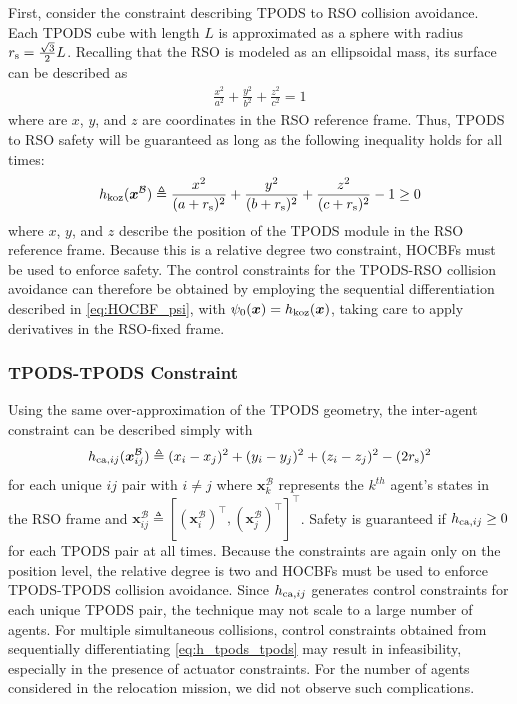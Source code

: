 First, consider the constraint describing TPODS to RSO collision avoidance. Each TPODS cube with length $L$ is approximated as a sphere with radius $r_{\rm s}=\frac{\sqrt{3}}{2}L$. Recalling that the RSO is modeled as an ellipsoidal mass, its surface can be described as
\begin{align}
    \frac{x^2}{a^2} + \frac{y^2}{b^2} + \frac{z^2}{c^2} = 1
\end{align}
where are $x$, $y$, and $z$ are coordinates in the RSO reference frame. Thus, TPODS to RSO safety will be guaranteed as long as the following inequality holds for all times:
\begin{align} \label{eq:koz}
    h_{\rm koz}(\boldsymbol{x}^{\mathcal{B}}) \triangleq \frac{x^2}{(a+r_{\rm s})^2} + \frac{y^2}{(b+r_{\rm s})^2} + \frac{z^2}{(c+r_{\rm s})^2} - 1 \geq 0
\end{align}
where $x$, $y$, and $z$ describe the position of the TPODS module in the RSO reference frame. Because this is a relative degree two constraint, HOCBFs must be used to enforce safety. The control constraints for the TPODS-RSO collision avoidance can therefore be obtained by employing the sequential differentiation described in \eqref{eq:HOCBF_psi}, with $\psi_0(\boldsymbol{x}) = h_{\rm koz}(\boldsymbol{x})$, taking care to apply derivatives in the RSO-fixed frame.

\subsubsection{TPODS-TPODS Constraint}

Using the same over-approximation of the TPODS geometry, the inter-agent constraint can be described simply with 
\begin{align} \label{eq:h_tpods_tpods}
    h_{{\rm ca},ij}(\boldsymbol{x}_{ij}^{\mathcal{B}}) \triangleq (x_i - x_j)^2 + (y_i - y_j)^2 + (z_i - z_j)^2 - (2r_{\rm s})^2
\end{align}
for each unique $ij$ pair with $i \neq j$ where $\boldsymbol{x}_{k}^{\mathcal{B}}$ represents the $k^{th}$ agent's states in the RSO frame and $\boldsymbol{x}_{ij}^{\mathcal{B}} \triangleq [(\boldsymbol{x}_{i}^{\mathcal{B}})^{\top}, (\boldsymbol{x}_{j}^{\mathcal{B}})^{\top}]^{\top}$. Safety is guaranteed if $h_{{\rm ca},ij} \geq 0$ for each TPODS pair at all times. Because the constraints are again only on the position level, the relative degree is two and HOCBFs must be used to enforce TPODS-TPODS collision avoidance. Since $h_{{\rm ca},ij}$ generates control constraints for each unique TPODS pair, the technique may not scale to a large number of agents. For multiple simultaneous collisions, control constraints obtained from sequentially differentiating \eqref{eq:h_tpods_tpods} may result in infeasibility, especially in the presence of actuator constraints. For the number of agents considered in the relocation mission, we did not observe such complications.